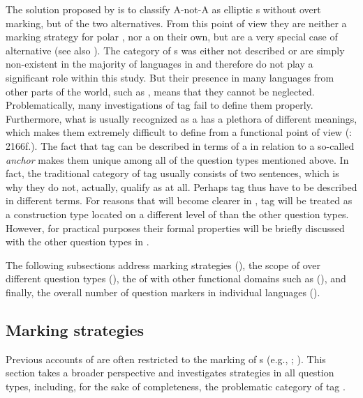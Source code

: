 \newpage     
\noindent The solution proposed by \cite{Hölzl2016a} is to classify A-not-A as elliptic s without overt marking, but  of the two alternatives. From this point of view they are neither a marking strategy for polar , nor a  on their own, but are a very special case of alternative  (see also \citealt{Clark1985}). The category of s was either not described or are simply non-existent in the majority of languages in  and therefore do not play a significant role within this study. But their presence in many languages from other parts of the world, such as , means that they cannot be neglected. Problematically, many investigations of tag  fail to define them properly. Furthermore, what is usually recognized as a  has a plethora of different meanings, which makes them extremely difficult to define from a functional point of view (\citealt{Mithun2012}: 2166f.). The fact that tag  can be described in terms of a \textit{} in relation to a so-called \textit{anchor} \citep{Axelsson2011} makes them unique among all of the question types mentioned above. In fact, the traditional category of tag  usually consists of two sentences, which is why they do not, actually, qualify as  at all. Perhaps tag  thus have to be described in different terms. For reasons that will become clearer in , tag  will be treated as a construction type located on a different level of  than the other question types. However, for practical purposes their formal properties will be briefly discussed with the other question types in .

The following subsections address marking strategies (), the scope of  over different question types (), the  of  with other functional domains such as  (), and finally, the overall number of question markers in individual languages ().

\subsection{Marking strategies}\label{sec:4.2.1}
\largerpage

Previous accounts of  are often restricted to the marking of s (e.g., \citealt{Miestamo2011}; \citealt{Dryer2013k,Dryer2013m}). This section takes a broader perspective and investigates  strategies in all question types, including, for the sake of completeness, the problematic category of tag .

